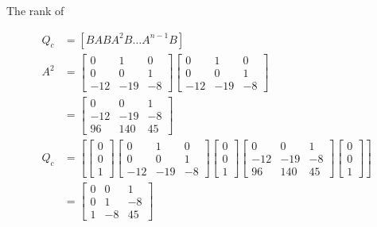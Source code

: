 \documentclass[main.tex]{subfiles}
\begin{document}
\begin{enumerate}
\begin{enumerate}
    The rank of
    
    $$
    \begin{aligned}  
    Q_c &= \left[B A B A^2 B \ldots A^{n-1} B\right]\\
    A^2 & = \left[\begin{array}{ccc}
    0 & 1 & 0 \\
    0 & 0 & 1 \\
    -12 & -19 & -8
    \end{array}\right] \left[\begin{array}{ccc}
    0 & 1 & 0 \\
    0 & 0 & 1 \\
    -12 & -19 & -8
    \end{array}\right] \\
    & = \left[\begin{array}{ccc}
    0 & 0 & 1 \\
    -12 & -19 & -8 \\
    96 & 140 & 45
    \end{array}\right]\\
    Q_c &= \left[\left[\begin{array}{l}
    0 \\
    0 \\
    1
    \end{array}\right] \left[\begin{array}{ccc}
    0 & 1 & 0 \\
    0 & 0 & 1 \\
    -12 & -19 & -8
    \end{array}\right] \left[\begin{array}{l}
    0 \\
    0 \\
    1
    \end{array}\right] \left[\begin{array}{ccc}
    0 & 0 & 1 \\
    -12 & -19 & -8 \\
    96 & 140 & 45
    \end{array}\right] \left[\begin{array}{l}
    0 \\
    0 \\
    1
    \end{array}\right] \right]\\
    & = \left[\begin{array}{ccc}
    0 & 0 & 1 \\
    0 & 1 & -8 \\
    1 & -8 & 45
    \end{array}\right]
    \end{aligned}
    $$
    

\end{enumerate}
\end{enumerate}
\end{document}
